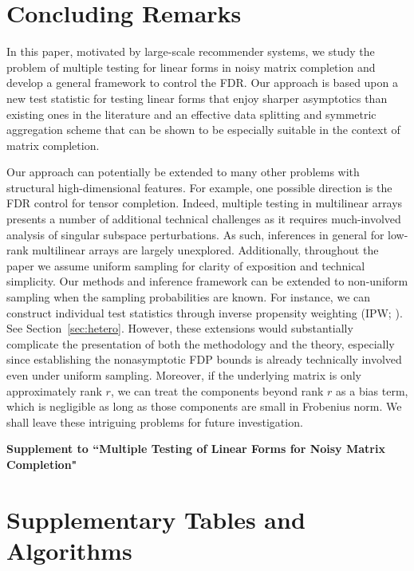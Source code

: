 \documentclass[12pt]{article}
\theoremstyle{plain}
\begin{document}
\begin{sloppypar}
\section{Concluding Remarks}\label{sec:remark}
In this paper, motivated by large-scale recommender systems, we study the problem of multiple testing for linear forms in noisy matrix completion and develop a general framework to control the FDR. Our approach is based upon a new test statistic for testing linear forms that enjoy sharper asymptotics than existing ones in the literature and an effective data splitting and symmetric aggregation scheme that can be shown to be especially suitable in the context of matrix completion.

Our approach can potentially be extended to many other problems with structural high-dimensional features. For example, one possible direction is the FDR control for tensor completion. Indeed, multiple testing in multilinear arrays presents a number of additional technical challenges as it requires much-involved analysis of singular subspace perturbations. As such, inferences in general for low-rank multilinear arrays are largely unexplored.  Additionally, throughout the paper we assume uniform sampling for clarity of exposition and technical simplicity. Our methods and inference framework can be extended to non-uniform sampling when the sampling probabilities are known. For instance, we can construct individual test statistics through inverse propensity weighting (IPW; \cite{duan2025online}). See Section~\ref{sec:hetero}. However, these extensions would substantially complicate the presentation of both the methodology and the theory, especially since establishing the nonasymptotic FDP bounds is already technically involved even under uniform sampling.  Moreover, if the underlying matrix is only approximately rank $r$, we can treat the components beyond rank $r$ as a bias term, which is negligible as long as those components are small in Frobenius norm. We shall leave these intriguing problems for future investigation.

\end{sloppypar}





\newpage

\appendix
\begin{center}
{\bf\LARGE Supplement to ``Multiple Testing of Linear Forms for Noisy Matrix Completion"}
\end{center}
\smallskip
\section{Supplementary Tables and Algorithms}\label{sec:supp-table-alg}
\end{document}

